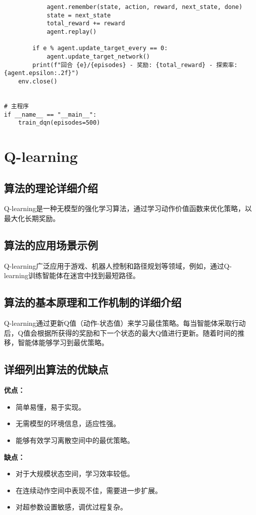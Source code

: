 \begin{lstlisting}
            agent.remember(state, action, reward, next_state, done)
            state = next_state
            total_reward += reward
            agent.replay()

        if e % agent.update_target_every == 0:
            agent.update_target_network()
        print(f"回合 {e}/{episodes} - 奖励: {total_reward} - 探索率: {agent.epsilon:.2f}")
    env.close()


# 主程序
if __name__ == "__main__":
    train_dqn(episodes=500)

\end{lstlisting}


\section{Q-learning}
\subsection*{算法的理论详细介绍}
Q-learning是一种无模型的强化学习算法，通过学习动作价值函数来优化策略，以最大化长期奖励。

\subsection*{算法的应用场景示例}
Q-learning广泛应用于游戏、机器人控制和路径规划等领域，例如，通过Q-learning训练智能体在迷宫中找到最短路径。

\subsection*{算法的基本原理和工作机制的详细介绍}
Q-learning通过更新Q值（动作-状态值）来学习最佳策略。每当智能体采取行动后，Q值会根据所获得的奖励和下一个状态的最大Q值进行更新。随着时间的推移，智能体能够学习到最优策略。

\subsection*{详细列出算法的优缺点}
\textbf{优点：}
\begin{itemize}
    \item 简单易懂，易于实现。
    \item 无需模型的环境信息，适应性强。
    \item 能够有效学习离散空间中的最优策略。
\end{itemize}

\textbf{缺点：}
\begin{itemize}
    \item 对于大规模状态空间，学习效率较低。
    \item 在连续动作空间中表现不佳，需要进一步扩展。
    \item 对超参数设置敏感，调优过程复杂。
\end{itemize}

